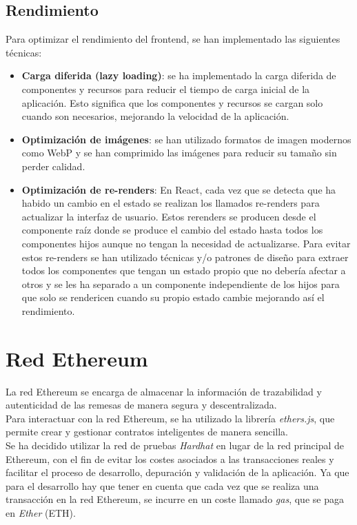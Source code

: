\subsection{Rendimiento}
Para optimizar el rendimiento del frontend, se han implementado las siguientes técnicas:
\begin{itemize}
    \item \textbf{Carga diferida (lazy loading)}: se ha implementado la carga diferida de componentes
    y recursos para reducir el tiempo de carga inicial de la aplicación. Esto significa que
    los componentes y recursos se cargan solo cuando son necesarios, mejorando la velocidad
    de la aplicación.
    \item \textbf{Optimización de imágenes}: se han utilizado formatos de imagen modernos como
    WebP y se han comprimido las imágenes para reducir su tamaño sin perder calidad.
    \item \textbf{Optimización de re-renders}: En React, cada vez que se detecta que ha habido un cambio
    en el estado se realizan los llamados re-renders para actualizar la interfaz de usuario. Estos rerenders se producen
    desde el componente raíz donde se produce el cambio del estado hasta todos los componentes hijos aunque 
    no tengan la necesidad de actualizarse. Para evitar estos re-renders se han utilizado técnicas y/o patrones de diseño
    para extraer todos los componentes que tengan un estado propio que no debería afectar a otros y se les ha separado a un componente independiente de los hijos
    para que solo se rendericen cuando su propio estado cambie mejorando así el rendimiento.
\end{itemize}

\section{Red Ethereum}
La red Ethereum se encarga de almacenar la información de trazabilidad y autenticidad
de las remesas de manera segura y descentralizada.\\
Para interactuar con la red Ethereum, se ha utilizado la librería \textit{ethers.js}, que
permite crear y gestionar contratos inteligentes de manera sencilla.\\

Se ha decidido utilizar la red de pruebas \textit{Hardhat} en lugar de la red principal de Ethereum, 
con el fin de evitar los costes asociados a las transacciones reales y facilitar el proceso de desarrollo, depuración y validación de la aplicación. 
Ya que para el desarrollo hay que tener en cuenta que cada vez que se realiza una transacción en
la red Ethereum, se incurre en un coste llamado \textit{gas}, que se paga en \textit{Ether} (ETH).\\

